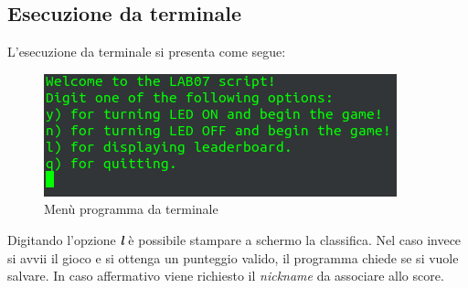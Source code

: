 \documentclass[a4paper]{article}
\begin{document}
	\subsection{Esecuzione da terminale}
		L'esecuzione da terminale si presenta come segue:

		\begin{figure}[H]
			\centering
			\includegraphics[scale=0.75]{img/terminal.png}
			\caption{Menù programma da terminale}
		\end{figure}
		Digitando l'opzione \textbf{\textit{l}} è possibile stampare a schermo la classifica.
		Nel caso invece si avvii il gioco e si ottenga un punteggio valido, il programma chiede se si vuole salvare. In caso affermativo viene richiesto il \textit{nickname} da associare allo score.
\end{document}
